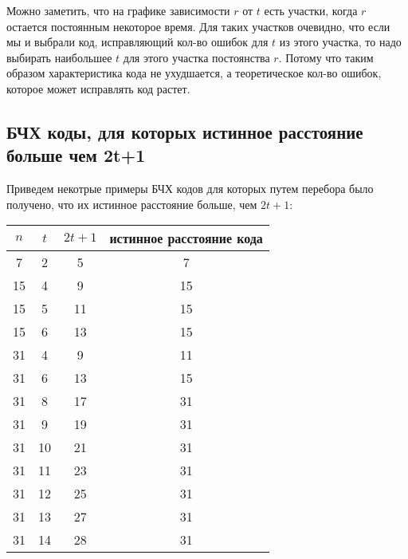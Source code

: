 \documentclass[12pt]{article}
\begin{document}
            Можно заметить, что на графике зависимости $r$ от $t$ есть участки, когда $r$ остается постоянным некоторое время. Для таких участков очевидно, что если мы и выбрали код, исправляющий кол-во ошибок для $t$ из этого участка, то надо выбирать наибольшее $t$ для этого участка постоянства $r$. Потому что таким образом характеристика кода не ухудшается, а теоретическое кол-во ошибок, которое может исправлять код растет.


        \subsection{БЧХ коды, для которых истинное расстояние больше чем 2t+1}
            Приведем некотрые примеры БЧХ кодов для которых путем перебора было получено, что их истинное расстояние больше, чем $2t + 1$:
            \begin{center}
                \begin{tabular}{|c|c|c|c|}
                    \hline
                    $n$ & $t$ & $2t + 1$ & истинное расстояние кода \\
                    \hline
                    7 & 2 & 5 & 7 \\
                    \hline
                    15 & 4 & 9 & 15 \\
                    \hline
                    15 & 5 & 11 & 15 \\
                    \hline
                    15 & 6 & 13 & 15 \\
                    \hline
                    31 & 4 & 9 & 11 \\
                    \hline
                    31 & 6 & 13 & 15 \\
                    \hline
                    31 & 8 & 17 & 31 \\
                    \hline
                    31 & 9 & 19 & 31 \\
                    \hline
                    31 & 10 & 21 & 31 \\
                    \hline
                    31 & 11 & 23 & 31 \\
                    \hline
                    31 & 12 & 25 & 31 \\
                    \hline
                    31 & 13 & 27 & 31 \\
                    \hline
                    31 & 14 & 28 & 31 \\
                    \hline
                \end{tabular}
            \end{center}
\end{document}
